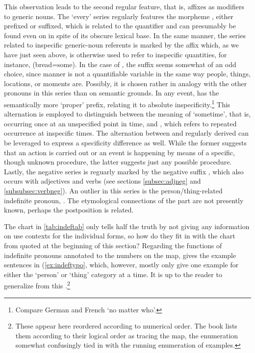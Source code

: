 This observation leads to the second regular feature, that is, affixes as 
modifiers to generic nouns. The `every' series regularly features the 
morpheme , either prefixed or suffixed, which is related to the 
quantifier  and can presumably be found 
even on  in spite of its obscure lexical base. In the same 
manner, the series related to inspecific generic-noun referents is marked by 
the affix  which, as we have just seen above, is otherwise 
used to refer to inspecific quantities, for instance, 
 (bread=some). In the case of 
, the suffix seems somewhat of an 
odd choice, since manner is not a quantifiable variable in the same way people,
things, locations, or moments are. Possibly, it is chosen rather in analogy
with the other pronouns in this series than on semantic grounds. In any event,
 has the semantically more `proper'  prefix,
relating it to absolute inspecificity.\footnote{Compare German
 and French  `no matter who'.} This 
alternation is employed to distinguish between the meaning of `sometime', that 
is, occurring once at an unspecified point in time, and 
, which refers to repeated occurrence at
inspecific times. The alternation between  and
regularly derived  can be leveraged to express a
specificity difference as well. While the former suggests that an action is
carried out or an event is happening by means of a specific, though unknown
procedure, the latter suggests just any possible procedure. Lastly, the
negative series is reguarly marked by the negative suffix ,
which also occurs with adjectives and verbs (see sections \ref{subsec:adjneg}
and \ref{subsubsec:verbneg}). An outlier in this series is the 
person/thing-related indefinite pronoun, . The etymological 
connections of the  part are not presently known, perhaps the 
postposition  is related.

The chart in \autoref{tab:indeftab} only tells half the truth by not giving any
information on use contexts for the individual forms, so how do they fit in
with the chart from \citet{haspelmath1997} quoted at the beginning of this
section? Regarding the functions of indefinite pronouns annotated to the
numbers on the map, \citet{haspelmath1997} gives the example sentences in
(\ref{ex:indeftypo}, which, however, mostly only give one example for either
the `person' or `thing' category at a time. It is up to the reader to
generalize from this \citep[2--3]{haspelmath1997}.\footnote{These appear here
reordered according to numerical order. The book lists them according to their
logical order as tracing the map, the enumeration somewhat confusingly tied in
with the running enumeration of examples.}

